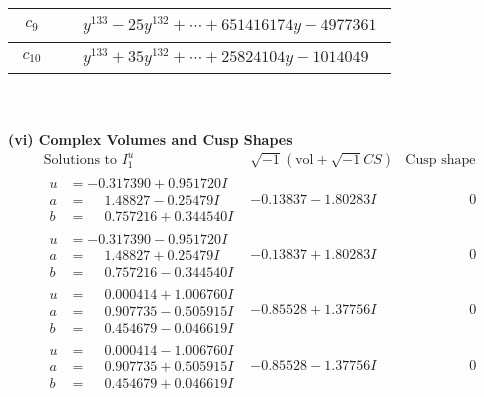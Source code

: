 \documentclass[1p]{elsarticle_modified}
\theoremstyle{definition}
\newcommand{\I}{\sqrt{-1}}
\begin{document}
\begin{tabular}{m{50pt}|m{274pt}}
\hline $$\begin{aligned}c_{9}\end{aligned}$$&$\begin{aligned}
&y^{133}-25 y^{132}+\cdots+651416174 y-4977361
\end{aligned}$\\
\hline $$\begin{aligned}c_{10}\end{aligned}$$&$\begin{aligned}
&y^{133}+35 y^{132}+\cdots+25824104 y-1014049
\end{aligned}$\\
\hline
\end{tabular}\\~\\
\newpage\flushleft \textbf{(vi) Complex Volumes and Cusp Shapes}
$$\begin{array}{c|c|c}  
\text{Solutions to }I^u_{1}& \I (\text{vol} + \sqrt{-1}CS) & \text{Cusp shape}\\
 \hline 
\begin{aligned}
u &= -0.317390 + 0.951720 I \\
a &= \phantom{-}1.48827 - 0.25479 I \\
b &= \phantom{-}0.757216 + 0.344540 I\end{aligned}
 & -0.13837 - 1.80283 I & \phantom{-0.000000 } 0 \\ \hline\begin{aligned}
u &= -0.317390 - 0.951720 I \\
a &= \phantom{-}1.48827 + 0.25479 I \\
b &= \phantom{-}0.757216 - 0.344540 I\end{aligned}
 & -0.13837 + 1.80283 I & \phantom{-0.000000 } 0 \\ \hline\begin{aligned}
u &= \phantom{-}0.000414 + 1.006760 I \\
a &= \phantom{-}0.907735 - 0.505915 I \\
b &= \phantom{-}0.454679 - 0.046619 I\end{aligned}
 & -0.85528 + 1.37756 I & \phantom{-0.000000 } 0 \\ \hline\begin{aligned}
u &= \phantom{-}0.000414 - 1.006760 I \\
a &= \phantom{-}0.907735 + 0.505915 I \\
b &= \phantom{-}0.454679 + 0.046619 I\end{aligned}
 & -0.85528 - 1.37756 I & \phantom{-0.000000 } 0 \\ \hline\begin{aligned}

\end{aligned}
\end{array}$$
\end{document}
